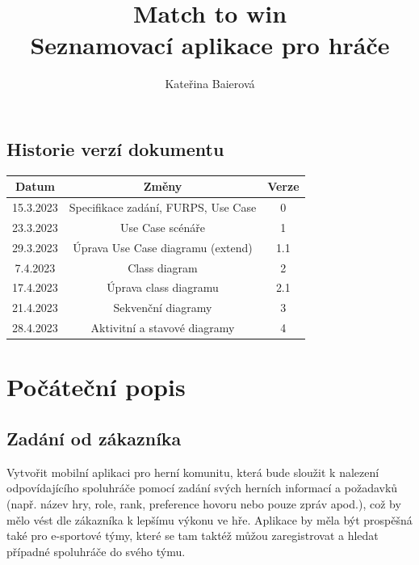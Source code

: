 \documentclass[czech,12pt,a4paper,titlepage]{article}
\title{%
    \textbf {Match to win} \\
    \large Seznamovací aplikace pro hráče}
\author{Kateřina Baierová}
\date{}
\begin{document}
\graphicspath{ {./img/} }

\begin{titlepage}
    \maketitle
    \thispagestyle{empty}
\end{titlepage}

\tableofcontents

\clearpage

\subsection*{Historie verzí dokumentu}

\bigskip
\bigskip
\bigskip

\begin{center}
    \begin{tabular}{ |c|c|c| }
        \hline
        Datum     & Změny                               & Verze \\
        \hline
        15.3.2023 & Specifikace zadání, FURPS, Use Case & 0     \\
        \hline
        23.3.2023 & Use Case scénáře                    & 1     \\
        \hline
        29.3.2023 & Úprava Use Case diagramu (extend)   & 1.1   \\
        \hline
        7.4.2023  & Class diagram                       & 2     \\
        \hline
        17.4.2023 & Úprava class diagramu               & 2.1   \\
        \hline
        21.4.2023 & Sekvenční diagramy                  & 3     \\
        \hline
        28.4.2023 & Aktivitní a stavové diagramy        & 4     \\
        \hline
    \end{tabular}
\end{center}

\clearpage

\section{Počáteční popis}

\subsection{Zadání od zákazníka}
Vytvořit mobilní aplikaci pro herní komunitu, která bude sloužit k nalezení odpovídajícího spoluhráče
pomocí zadání svých herních informací a požadavků (např. název hry, role, rank, preference hovoru nebo
pouze zpráv apod.), což by mělo vést dle zákazníka k lepšímu výkonu ve hře. Aplikace by měla být prospěšná
také pro e-sportové týmy, které se tam taktéž můžou zaregistrovat a hledat případné spoluhráče do svého týmu.
\end{document}
